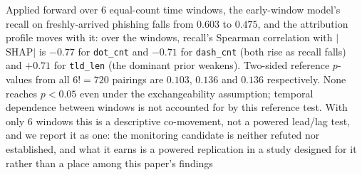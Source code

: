 Applied forward over 6 equal-count time windows, the early-window model's recall on freshly-arrived phishing falls from $0.603$ to $0.475$, and the attribution profile moves with it: over the windows, recall's Spearman correlation with $|$SHAP$|$ is $-0.77$ for \texttt{dot\_cnt} and $-0.71$ for \texttt{dash\_cnt} (both rise as recall falls) and $+0.71$ for \texttt{tld\_len} (the dominant prior weakens). Two-sided reference $p$-values from all $6! = 720$ pairings are $0.103$, $0.136$ and $0.136$ respectively. None reaches $p<0.05$ even under the exchangeability assumption; temporal dependence between windows is not accounted for by this reference test. With only 6 windows this is a descriptive co-movement, not a powered lead/lag test, and we report it as one: the monitoring candidate is neither refuted nor established, and what it earns is a powered replication in a study designed for it rather than a place among this paper's findings%
